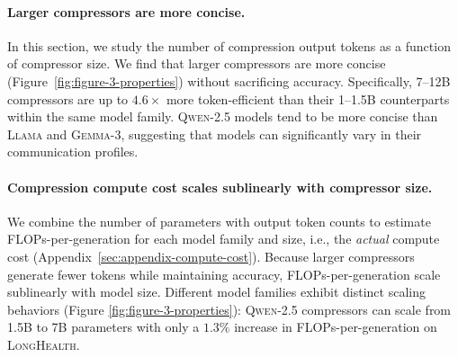 \documentclass{article} %
\begin{document}
\paragraph*{Larger compressors are more concise.}
In this section, we study the number of compression output tokens as a function of compressor size. We find that larger compressors are more concise (Figure~\ref{fig:figure-3-properties}) without sacrificing accuracy.
Specifically, 7--12B compressors are up to \(4.6\times\) more token-efficient than their 1--1.5B counterparts within the same model family. %
\textsc{Qwen-2.5} models tend to be more concise than \textsc{Llama} and \textsc{Gemma-3}, suggesting that models can significantly vary in their communication profiles.

\paragraph*{Compression compute cost scales sublinearly with compressor size.}
We combine the number of parameters with output token counts to estimate FLOPs-per-generation for each model family and size, i.e., the \emph{actual} compute cost (Appendix~\ref{sec:appendix-compute-cost}). Because larger compressors generate fewer tokens while maintaining accuracy, FLOPs-per-generation scale sublinearly with model size. Different model families exhibit distinct scaling behaviors (Figure \ref{fig:figure-3-properties}): \textsc{Qwen-2.5} compressors can scale from 1.5B to 7B parameters with only a \(1.3\%\) increase in FLOPs-per-generation on \textsc{LongHealth}.
\end{document}
